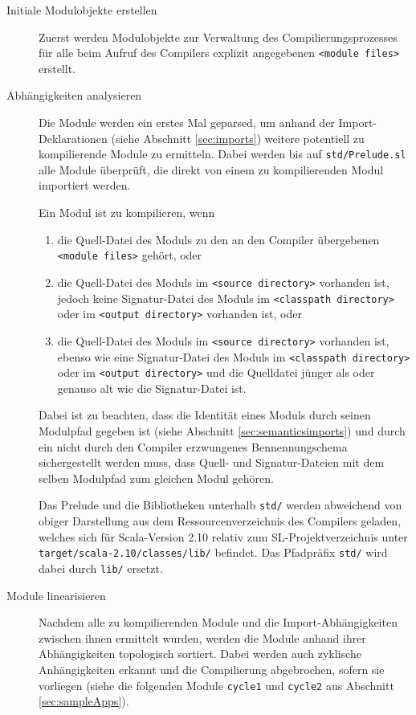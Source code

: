 \documentclass[runningheads]{llncs}
\begin{document}
\begin{description}
\item[Initiale Modulobjekte erstellen] Zuerst werden Modulobjekte zur Verwaltung
    des Compilierungsprozesses für alle beim Aufruf des Compilers
    explizit angegebenen \texttt{<module files>} erstellt.
\item[Abhängigkeiten analysieren] 
    Die Module werden ein erstes Mal geparsed, um anhand der
    Import-Deklarationen (siehe Abschnitt \ref{sec:imports}) weitere
    potentiell zu kompilierende Module zu ermitteln. Dabei werden bis
    auf \texttt{std/Prelude.sl} alle Module überprüft, die direkt von
    einem zu kompilierenden Modul importiert werden.
    
    Ein Modul ist zu kompilieren, wenn
    \begin{enumerate}
    \item die Quell-Datei des Moduls zu den an den Compiler
        übergebenen \texttt{<module files>} gehört, oder
    \item die Quell-Datei des Moduls im \texttt{<source directory>}
        vorhanden ist, jedoch keine Signatur-Datei des Moduls im
        \texttt{<classpath directory>} oder im \texttt{<output directory>}
        vorhanden ist, oder
    \item die Quell-Datei des Moduls im \texttt{<source directory>}
        vorhanden ist, ebenso wie eine Signatur-Datei des Moduls im
        \texttt{<classpath directory>} oder im \texttt{<output directory>}
        und die Quelldatei jünger als oder genauso alt wie die
        Signatur-Datei ist.
    \end{enumerate}
    Dabei ist zu beachten, dass die Identität eines Moduls durch seinen
    Modulpfad gegeben ist (siehe Abschnitt \ref{sec:semanticsimports}) und durch ein nicht
    durch den Compiler erzwungenes Bennennungschema sichergestellt
    werden muss, dass Quell- und Signatur-Dateien mit dem selben
    Modulpfad zum gleichen Modul gehören.
    
    Das Prelude und die Bibliotheken unterhalb \texttt{std/} werden
    abweichend von obiger Darstellung aus dem Ressourcenverzeichnis
    des Compilers geladen, welches sich für Scala-Version 2.10
    relativ zum SL-Projektverzeichnis unter \texttt{target/scala-2.10/classes/lib/}
    befindet. Das Pfadpräfix \texttt{std/} wird dabei durch
    \texttt{lib/} ersetzt.
\item[Module linearisieren] Nachdem alle zu kompilierenden Module und
    die Import-Abhängigkeiten zwischen ihnen ermittelt wurden, werden
    die Module anhand ihrer Abhängigkeiten topologisch sortiert. Dabei
    werden auch zyklische Anhängigkeiten erkannt und die Compilierung
    abgebrochen, sofern sie vorliegen (siehe die folgenden Module
    \texttt{cycle1} und \texttt{cycle2} aus Abschnitt \ref{sec:sampleApps}).
    

\end{description}
\end{document}
